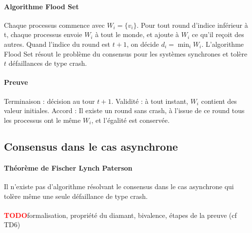 \documentclass[french]{article}
\newcommand{\TODO}{\textcolor{red}{\textbf{TODO}}}
\begin{document}
\paragraph{Algorithme Flood Set} Chaque processus commence avec $W_i = \lbrace v_i \rbrace$. Pour tout round d'indice inférieur à t, chaque processus envoie $W_i$ à tout le monde, et ajoute à $W_i$ ce qu'il reçoit des autres. Quand l'indice du round est $t + 1$, on décide $d_i = \min_i W_i$. L'algorithme Flood Set résout le problème du consensus pour les systèmes synchrones et tolère $t$ défaillances de type crash.

\paragraph{Preuve} Terminaison : décision au tour $t + 1$. Validité : à tout instant, $W_i$ contient des valeur initiales. Accord : Il existe un round sans crash, à l'issue de ce round tous les processus ont le même $W_i$, et l'égalité est conservée.


\subsection{Consensus dans le cas asynchrone}

\paragraph{Théorème de Fischer Lynch Paterson}Il n'existe pas d'algorithme résolvant le consensus dans le cas asynchrone qui tolère même une seule défaillance de type crash.

\paragraph{}\TODO formalisation, propriété du diamant, bivalence, étapes de la preuve (cf TD6)
\end{document}
